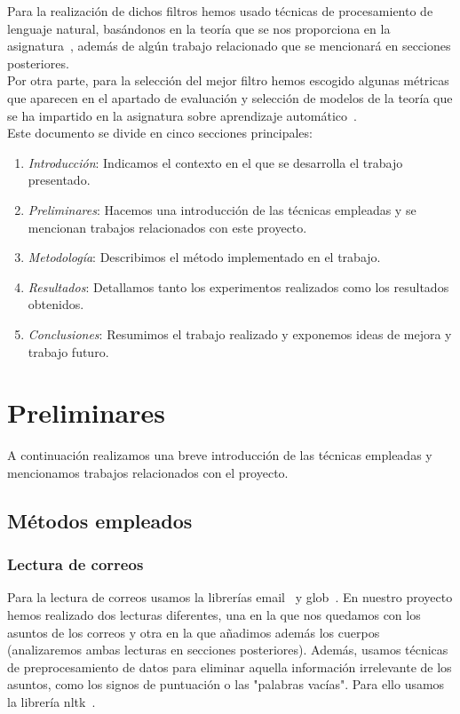 \documentclass[conference,a4paper]{IEEEtran}
\begin{document}
Para la realización de dichos filtros hemos usado  técnicas de procesamiento de lenguaje natural, basándonos en la teoría que se nos proporciona en la asignatura~\cite{b1}, además de algún trabajo relacionado que se mencionará en secciones posteriores. \\

Por otra parte, para la selección del mejor filtro hemos escogido algunas métricas que aparecen en el apartado de evaluación y selección de modelos de la teoría que se ha impartido en la asignatura sobre aprendizaje automático~\cite{b2}. \\

Este documento se divide en cinco secciones principales:
\begin{enumerate}
\item \textit{Introducción}: Indicamos el contexto en el que se desarrolla el trabajo presentado.
\item \textit{Preliminares}: Hacemos una introducción de las técnicas empleadas y se mencionan trabajos relacionados con este proyecto.
\item \textit{Metodología}: Describimos el método implementado en el trabajo.
\item \textit{Resultados}: Detallamos tanto los experimentos realizados como los resultados obtenidos.
\item \textit{Conclusiones}: Resumimos el trabajo realizado y exponemos ideas de mejora y trabajo futuro.
\end{enumerate}


\section{Preliminares}

A continuación realizamos una breve introducción de las técnicas empleadas y mencionamos trabajos relacionados con el proyecto.

\subsection{Métodos empleados}

\subsubsection{Lectura de correos}
Para la lectura de correos usamos la librerías email~\cite{b3} y glob~\cite{b4}. En nuestro proyecto hemos realizado dos lecturas diferentes, una en la que nos quedamos con los asuntos de los correos y otra en la que añadimos además los cuerpos (analizaremos ambas lecturas en secciones posteriores). Además, usamos técnicas de preprocesamiento de datos para eliminar aquella información irrelevante de los asuntos, como los signos de puntuación o las "palabras vacías". Para ello usamos la librería nltk~\cite{b5}.\\
\end{document}
